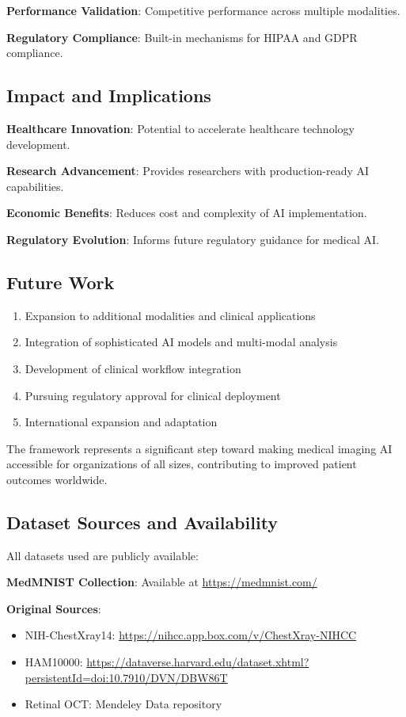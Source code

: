 \documentclass[12pt,a4paper]{article}
\begin{document}
\textbf{Performance Validation}: Competitive performance across multiple modalities.

\textbf{Regulatory Compliance}: Built-in mechanisms for HIPAA and GDPR compliance.

\subsection{Impact and Implications}

\textbf{Healthcare Innovation}: Potential to accelerate healthcare technology development.

\textbf{Research Advancement}: Provides researchers with production-ready AI capabilities.

\textbf{Economic Benefits}: Reduces cost and complexity of AI implementation.

\textbf{Regulatory Evolution}: Informs future regulatory guidance for medical AI.

\subsection{Future Work}

\begin{enumerate}
    \item Expansion to additional modalities and clinical applications
    \item Integration of sophisticated AI models and multi-modal analysis
    \item Development of clinical workflow integration
    \item Pursuing regulatory approval for clinical deployment
    \item International expansion and adaptation
\end{enumerate}

The framework represents a significant step toward making medical imaging AI accessible for organizations of all sizes, contributing to improved patient outcomes worldwide.

\subsection{Dataset Sources and Availability}

All datasets used are publicly available:

\textbf{MedMNIST Collection}: Available at \url{https://medmnist.com/}

\textbf{Original Sources}:
\begin{itemize}
    \item NIH-ChestXray14: \url{https://nihcc.app.box.com/v/ChestXray-NIHCC}
    \item HAM10000: \url{https://dataverse.harvard.edu/dataset.xhtml?persistentId=doi:10.7910/DVN/DBW86T}
    \item Retinal OCT: Mendeley Data repository
\end{itemize}
\end{document}
